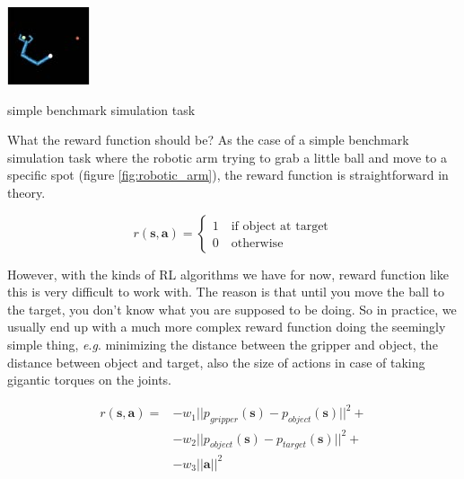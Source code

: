 \documentclass{tufte-handout}
\newcommand{\eg}{\textit{e}.\textit{g}. }
\begin{document}
\begin{marginfigure}
  \centering
  \includegraphics[width=\linewidth]{robotic_arm}
  \caption{simple benchmark simulation task}
  \label{fig:robotic_arm}
\end{marginfigure}

What the reward function should be? As the case of a simple benchmark simulation task where the robotic arm trying to grab a little ball and move to a specific spot (figure \ref{fig:robotic_arm}), the reward function is straightforward in theory.

$$
r(\mathbf{s}, \mathbf{a}) = \begin{cases}
1 \quad \text{if object at target} \\
0 \quad \text{otherwise}
\end{cases}
$$

However, with the kinds of RL algorithms we have for now, reward function like this is very difficult to work with. The reason is that until you move the ball to the target, you don't know what you are supposed to be doing. So in practice, we usually end up with a much more complex reward function doing the seemingly simple thing, \eg minimizing the distance between the gripper and object, the distance between object and target, also the size of actions in case of taking gigantic torques on the joints.

\begin{align*}
r(\mathbf{s}, \mathbf{a}) =
& - w_1 || p_{gripper} (\mathbf{s}) - p_{object}(\mathbf{s}) || ^ 2  + \\
& - w_2 || p_{object} (\mathbf{s}) - p_{target}(\mathbf{s}) || ^ 2  + \\
& - w_3 || \mathbf{a} || ^2
\end{align*}
\end{document}
